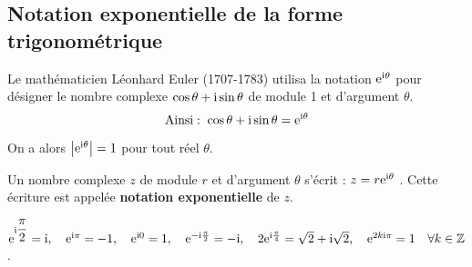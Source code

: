  \subsection*{Notation exponentielle de la  forme trigonométrique} 
 Le mathématicien Léonhard Euler (1707-1783) utilisa la notation $ \mathrm{e}^{\text{i} \theta } $ pour désigner le nombre complexe $ \cos \theta +\text{i} \sin \theta $ de module 1 et d'argument $ \theta $.
 \[\text{Ainsi}:\; \cos \theta +\text{i} \sin \theta= \mathrm{e}^{\text{i} \theta }  \]
 
 On a alors \; $ \left|\mathrm{e}^{\text{i} \theta }\right| =1$ pour tout réel $ \theta $.
 
 \medskip
 \begin{definition}
 Un nombre complexe $ z $ de module $ r $ et d'argument $ \theta $
s'écrit : $z=r \mathrm{e}^{\text{i} \theta }$ . Cette écriture est appelée  \textbf{notation exponentielle} de $ z $.
\end{definition}
 \medskip

\begin{example}
 $  \mathrm{e}^{\text{i} \dfrac{\pi}{2} }=\text{i} ,\quad     \mathrm{e}^{\text{i} \pi }=-1 ,\quad    \mathrm{e}^{\text{i} 0 }=1 ,\quad    \mathrm{e}^{-\text{i} \frac{\pi}{2} }=-\text{i} ,  \quad    2\mathrm{e}^{\text{i} \frac{\pi}{4} }=\sqrt{2}+ \text{i}\sqrt{2}, \quad    \mathrm{e}^{2k\text{i}\pi}=1\quad   \forall k\in\mathbb{Z}$.
 \end{example}
 
